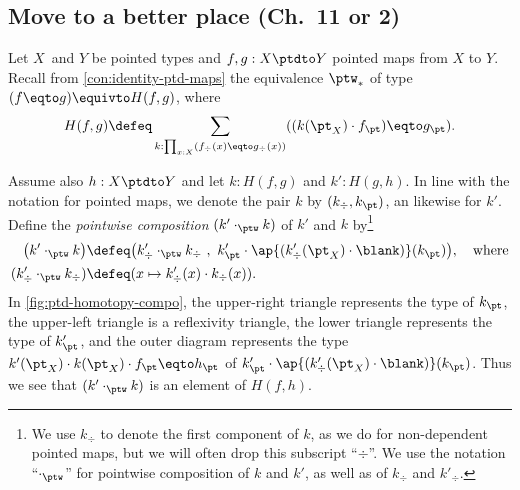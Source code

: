 \subsection{Move to a better place (Ch.\ 11 or 2)}
\begin{marginfigure}
  \caption{\label{fig:ptd-homotopy-compo}
  Path for $(k'\cdot_{\protect\ptw} k)$.} 
\end{marginfigure}
\begin{definition}\label{def:ptd-homotopy-compo}
Let $X$ and $Y$ be pointed types and
$f,g: X\ptdto Y$ pointed maps from $X$ to $Y$.
Recall from \cref{con:identity-ptd-maps} the equivalence $\ptw_*$ of type 
$(f\eqto g) \equivto H(f,g)$, where 
\[ H(f,g) \defeq \sum_{k:\prod_{x:X}(f_\div(x)\eqto g_\div(x))}
                               ((k(\pt_X)\cdot f_\pt) \eqto g_\pt ).
\]

Assume also $h: X\ptdto Y$ and let $k: H(f,g)$ and 
$k': H(g,h)$. In line with the notation for pointed maps, 
we denote the pair $k$ by $(k_\div,k_\pt)$, an likewise for $k'$. 
Define the \emph{pointwise composition}
$(k'\cdot_{\ptw} k)$ of $k'$ and $k$ by\footnote{%
We use $k_\div$ to denote the first component of $k$,
as we do for non-dependent pointed maps, but we will often drop
this subscript ``$\div$''.
We use the notation ``$\cdot_{\ptw}$'' for pointwise composition
of $k$ and $k'$, as well as of $k_\div$ and $k'_\div$.}
\begin{align*}
\bigl(k'\cdot_{\ptw} k\bigr)&\defeq
\bigl(k'_\div\cdot_{\ptw} k_\div ~,~ 
       k'_\pt\cdot\ap{(k'_\div(\pt_X)\cdot\blank)}(k_\pt)\bigr),
\quad\text{where}\\
(k'_\div\cdot_{\ptw} k_\div) &\defeq (x\mapsto k'_\div(x)\cdot k_\div(x)).
\end{align*}
In \cref{fig:ptd-homotopy-compo}, the upper-right triangle represents
the type of $k_\pt$, the upper-left triangle is a reflexivity triangle,
the lower triangle represents the type of $k'_\pt$,
and the outer diagram represents the type 
$k'(\pt_X)\cdot k(\pt_X)\cdot f_\pt \eqto h_\pt$
of $k'_\pt\cdot\ap{(k'_\div(\pt_X)\cdot\blank)}(k_\pt)$.
Thus we see that $(k'\cdot_{\ptw} k)$ is an element of $H(f,h)$.
\end{definition}

